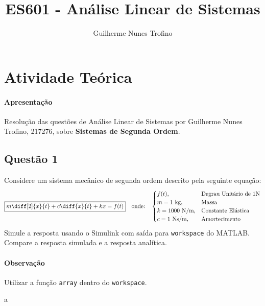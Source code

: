 \documentclass{article}
\title{ES601 - Análise Linear de Sistemas}
\author{Guilherme Nunes Trofino}
\begin{document}
    \maketitle
\newpage

    \section{Atividade Teórica}
        \paragraph{Apresentação}Resolução das questões de Análise Linear de Sistemas por Guilherme Nunes Trofino, 217276, sobre \textbf{Sistemas de Segunda Ordem}.

        \subsection{Questão 1}
            \begin{exercise}
                Considere um sistema mecânico de segunda ordem descrito pela seguinte equação:
                    \begin{equation}
                        \boxed{
                            m\diff[2]{x}{t} + 
                            c\diff{x}{t} +
                            kx = 
                            f(t)
                        }
                        \quad
                        \text{onde:}
                        \quad
                        \begin{cases}
                            f(t),                & \text{Degrau Unitário de 1N}\\
                            m = 1\text{ kg},     & \text{Massa}\\
                            k = 1000\text{ N/m}, & \text{Constante Elástica}\\
                            c = 1\text{ Ns/m},   & \text{Amortecimento}\\
                        \end{cases}
                    \end{equation}
                Simule a resposta usando o Simulink com saída para \texttt{workspace} do MATLAB. Compare a resposta simulada e a resposta analítica.

                \paragraph{Observação}Utilizar a função \texttt{array} dentro do \texttt{workspace}.
            \end{exercise}
            \begin{resolution}
                a
            \end{resolution}
\end{document}
